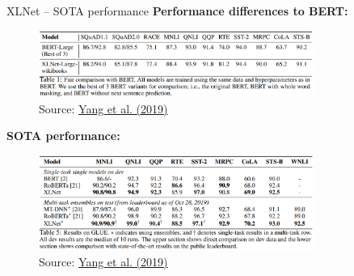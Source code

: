\documentclass[]{beamer}
\begin{document}
\begin{frame}{XLNet -- SOTA performance}
\small
	\textbf{Performance differences to BERT:}

	\begin{figure}
		\centering
		\includegraphics[width = 9cm]{figure/xlnet-vs-bert.png}\\ 
		\footnotesize{Source:} \href{https://papers.nips.cc/paper/8812-xlnet-generalized-autoregressive-pretraining-for-language-understanding.pdf}{\footnotesize Yang et al. (2019)}
	\end{figure}

	\textbf{SOTA performance:}

	\begin{figure}
		\centering
		\includegraphics[width = 9cm]{figure/xlnet-sota.png}\\ 
		\footnotesize{Source:} \href{https://papers.nips.cc/paper/8812-xlnet-generalized-autoregressive-pretraining-for-language-understanding.pdf}{\footnotesize Yang et al. (2019)}
	\end{figure}
\end{frame}
\end{document}
